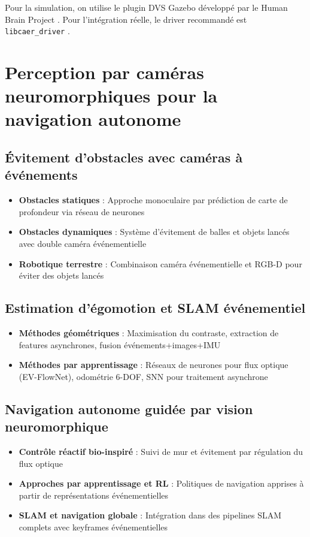 Pour la simulation, on utilise le plugin DVS Gazebo développé par le Human Brain Project \cite{hbp2024gazebo}. Pour l'intégration réelle, le driver recommandé est \texttt{libcaer\_driver} \cite{rosevent2024libcaer}.

\section{Perception par caméras neuromorphiques pour la navigation autonome}
\subsection{Évitement d'obstacles avec caméras à événements}
\begin{itemize}
\item \textbf{Obstacles statiques} : Approche monoculaire par prédiction de carte de profondeur via réseau de neurones \cite{bhattacharya2024monocular}
\item \textbf{Obstacles dynamiques} : Système d'évitement de balles et objets lancés \cite{falanga2020dynamic} avec double caméra événementielle
\item \textbf{Robotique terrestre} : Combinaison caméra événementielle et RGB-D pour éviter des objets lancés \cite{zhu2023dynamic}
\end{itemize}

\subsection{Estimation d'égomotion et SLAM événementiel}
\begin{itemize}
\item \textbf{Méthodes géométriques} : Maximisation du contraste, extraction de features asynchrones, fusion événements+images+IMU \cite{rebecq2017evo, rosinol2018ultimate}
\item \textbf{Méthodes par apprentissage} : Réseaux de neurones pour flux optique (EV-FlowNet), odométrie 6-DOF, SNN pour traitement asynchrone \cite{gehrig2020eklt}
\end{itemize}

\subsection{Navigation autonome guidée par vision neuromorphique}
\begin{itemize}
\item \textbf{Contrôle réactif bio-inspiré} : Suivi de mur et évitement par régulation du flux optique
\item \textbf{Approches par apprentissage et RL} : Politiques de navigation apprises à partir de représentations événementielles \cite{bugueno2025human}
\item \textbf{SLAM et navigation globale} : Intégration dans des pipelines SLAM complets avec keyframes événementielles \cite{rebecq2017evo}
\end{itemize}

